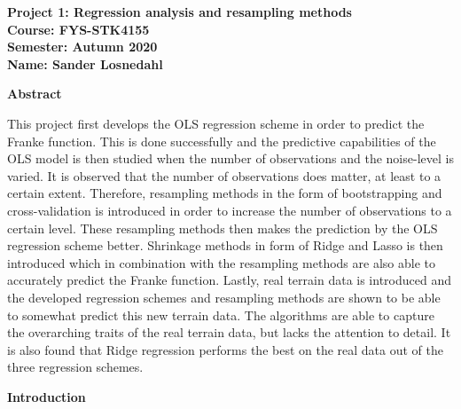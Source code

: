 \documentclass[12pt,a4paper]{article}
\begin{document}
\begin{center}
\LARGE{\textbf{Project 1: Regression analysis and resampling methods}}
\\
\large{\textbf{Course: FYS-STK4155}}
\\
\large{\textbf{Semester: Autumn 2020}}
\\
\large{\textbf{Name: Sander Losnedahl}}
\end{center}

\begin{center}
\Large{\textbf{Abstract}}
\end{center}

\noindent This project first develops the OLS regression scheme in order to predict the Franke function. This is done successfully and the predictive capabilities of the OLS model is then studied when the number of observations and the noise-level is varied. It is observed that the number of observations does matter, at least to a certain extent. Therefore, resampling methods in the form of bootstrapping and cross-validation is introduced in order to increase the number of observations to a certain level. These resampling methods then makes the prediction by the OLS regression scheme better. Shrinkage methods in form of Ridge and Lasso is then introduced which in combination with the resampling methods are also able to accurately predict the Franke function. Lastly, real terrain data is introduced and the developed regression schemes and resampling methods are shown to be able to somewhat predict this new terrain data. The algorithms are able to capture the overarching traits of the real terrain data, but lacks the attention to detail. It is also found that Ridge regression performs the best on the real data out of the three regression schemes.

\newpage

\begin{center}
\Large{\textbf{Introduction}}
\end{center}
\end{document}
